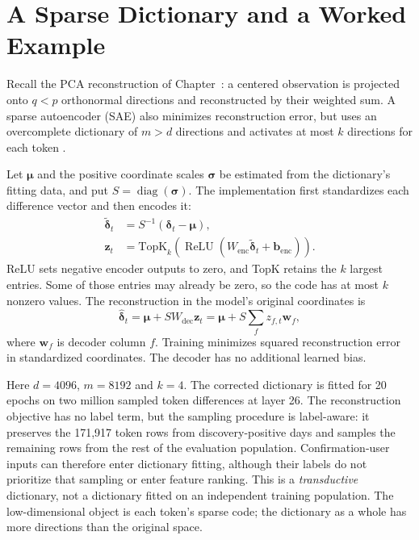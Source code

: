 \documentclass[12pt]{report}
\newcommand{\chref}[1]{Chapter~\uppercase\expandafter{\romannumeral\getrefnumber{#1}}}
\begin{document}
\section{A Sparse Dictionary and a Worked Example}
Recall the PCA reconstruction of \chref{ch:pca}: a centered observation is projected onto
$q<p$ orthonormal directions and reconstructed by their weighted sum. A sparse autoencoder
(SAE) also minimizes reconstruction error, but uses an overcomplete dictionary of $m>d$
directions and activates at most $k$ directions for each token \cite{gao2024scaling}.

Let $\boldsymbol{\mu}$ and the positive coordinate scales $\boldsymbol{\sigma}$ be estimated
from the dictionary's fitting data, and put $S=\operatorname{diag}(\boldsymbol{\sigma})$.
The implementation first standardizes each difference vector and then encodes it:
\begin{equation}
\begin{split}
\widetilde{\boldsymbol{\delta}}_t&=S^{-1}(\boldsymbol{\delta}_t-\boldsymbol{\mu}),\\
\mathbf{z}_t&=\mathrm{TopK}_k\!\left(\operatorname{ReLU}
  (W_{\mathrm{enc}}\widetilde{\boldsymbol{\delta}}_t+\mathbf{b}_{\mathrm{enc}})\right).
\end{split}
\label{eq:sae-encode}
\end{equation}
ReLU sets negative encoder outputs to zero, and TopK retains the $k$ largest entries.
Some of those entries may already be zero, so the code has at most $k$ nonzero values.
The reconstruction in the model's original coordinates is
\begin{equation}
\widehat{\boldsymbol{\delta}}_t
 =\boldsymbol{\mu}+S W_{\mathrm{dec}}\mathbf{z}_t
 =\boldsymbol{\mu}+S\sum_f z_{f,t}\mathbf{w}_f,
\label{eq:sae-decode}
\end{equation}
where $\mathbf{w}_f$ is decoder column $f$. Training minimizes squared reconstruction error
in standardized coordinates. The decoder has no additional learned bias.

Here $d=4096$, $m=8192$ and $k=4$. The corrected dictionary is fitted for 20 epochs on two
million sampled token differences at layer 26. The reconstruction objective has no label
term, but the sampling procedure is label-aware: it preserves the 171,917 token rows from
discovery-positive days and samples the remaining rows from the rest of the evaluation
population. Confirmation-user inputs can therefore enter dictionary fitting, although
their labels do not prioritize that sampling or enter feature ranking. This is a
\emph{transductive} dictionary, not a dictionary fitted on an independent training population.
The low-dimensional object is each token's sparse code; the dictionary as a whole has more
directions than the original space.
\end{document}
